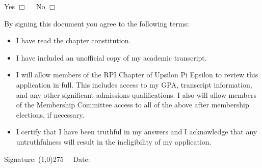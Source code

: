 \documentclass{article}
\begin{document}
\vspace{0.2in}

\hspace*{15pt} Yes $\Box$ \ \ No $\Box$

\vspace*{0.2in}

By signing this document you agree to the following terms:
\begin{itemize}
\item I have read the chapter constitution.
\item I have included an unofficial copy of my academic transcript.
\item I will allow members of the RPI Chapter of Upsilon Pi Epsilon to review this application in full.
This includes access to my GPA, transcript information, and any other significant admissions qualifications.
I also will allow members of the Membership Committee access to all of the above after membership elections, if necessary.
\item I certify that I have been truthful in my answers and I acknowledge that any untruthfulness will result in the ineligibility of my application.
\end{itemize}

\vspace*{0.1in}

Signature: \line(1,0){275} \ \ Date: \hrulefill
\end{document}
